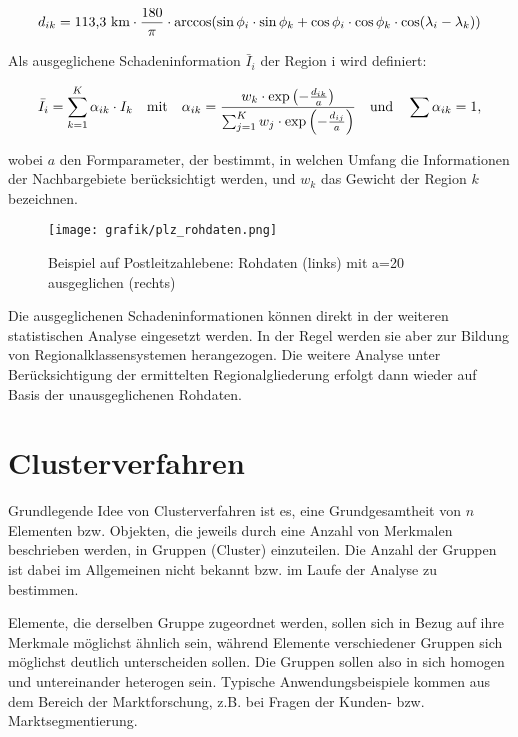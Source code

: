 \begin{eqnarray} 
d_{ik} =  \textnormal{113,3 km} \cdot \frac{180}{\pi} \cdot \arccos(\sin \phi_i \cdot \sin \phi_k + \cos \phi_i \cdot \cos \phi_k \cdot \cos(\lambda_i-\lambda_k))
\end{eqnarray}

 Als ausgeglichene Schadeninformation $\bar{I}_i$  der Region i wird definiert: 

\begin{eqnarray} 
\bar{I}_i = \sum_{k=1}^K  \alpha_{ik} \cdot I_k    \quad  \textnormal{mit}  \quad    \alpha_{ik} = \frac{w_k \cdot \exp \left( - \frac{d_{ik}}{a} \right)}   {\sum_{j=1}^K w_j \cdot  \exp \left( - \frac{d_{ij}}{a}\right)}      \quad  \textnormal{und}  \quad   \sum \alpha_{ik}=1,
\end{eqnarray}

wobei $a$  den Formparameter, der bestimmt, in welchen Umfang die Informationen der Nachbargebiete berücksichtigt werden, und $w_k$   das Gewicht der Region $k$ bezeichnen.
 
\begin{figure}  %
	\centering
  \texttt{[image: grafik/plz\_rohdaten.png]}
      \caption{Beispiel auf Postleitzahlebene: Rohdaten (links) mit a=20 ausgeglichen (rechts)}
	\label{fig:plz_rohdaten}
	
\end{figure} 

Die ausgeglichenen Schadeninformationen können direkt in der weiteren statistischen Analyse eingesetzt werden. In der Regel werden sie aber zur Bildung von Regionalklassensystemen herangezogen. Die weitere Analyse unter Berücksichtigung der ermittelten Regionalgliederung erfolgt dann wieder auf Basis der unausgeglichenen Rohdaten.
 

\section{Clusterverfahren} \label{Clusterverfahren}%

Grundlegende Idee von Clusterverfahren ist es, eine Grundgesamtheit von $n$ Elementen bzw. Objekten, die jeweils durch eine Anzahl von Merkmalen beschrieben werden, in Gruppen (Cluster) einzuteilen. Die Anzahl der Gruppen ist dabei im Allgemeinen nicht bekannt bzw. im Laufe der Analyse zu bestimmen.

Elemente, die derselben Gruppe zugeordnet werden, sollen sich in Bezug auf ihre Merkmale möglichst ähnlich sein, während Elemente verschiedener Gruppen sich möglichst deutlich unterscheiden sollen. Die Gruppen sollen also in sich homogen und untereinander heterogen sein. Typische Anwendungsbeispiele kommen aus dem Bereich der Marktforschung, z.B. bei Fragen der Kunden- bzw. Marktsegmentierung.

